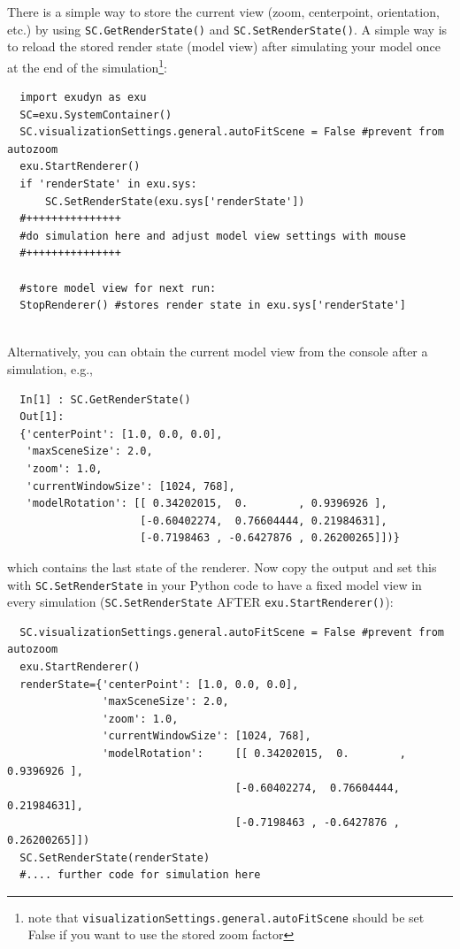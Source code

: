 \label{sec:storing:modelview}
There is a simple way to store the current view (zoom, centerpoint, orientation, etc.) by using \texttt{SC.GetRenderState()} and \texttt{SC.SetRenderState()}.
%
A simple way is to reload the stored render state (model view) after simulating your model once at the end of the simulation\footnote{
note that \texttt{visualizationSettings.general.autoFitScene} should be set False if you want to use the stored zoom factor}:
\pythonstyle\begin{lstlisting}
  import exudyn as exu
  SC=exu.SystemContainer()
  SC.visualizationSettings.general.autoFitScene = False #prevent from autozoom
  exu.StartRenderer()
  if 'renderState' in exu.sys:
      SC.SetRenderState(exu.sys['renderState']) 
  #+++++++++++++++
  #do simulation here and adjust model view settings with mouse
  #+++++++++++++++

  #store model view for next run:
  StopRenderer() #stores render state in exu.sys['renderState']
\end{lstlisting}
\horizontalRuler \\
%
Alternatively, you can obtain the current model view from the console after a simulation, e.g.,
\pythonstyle\begin{lstlisting}
  In[1] : SC.GetRenderState()
  Out[1]: 
  {'centerPoint': [1.0, 0.0, 0.0],
   'maxSceneSize': 2.0,
   'zoom': 1.0,
   'currentWindowSize': [1024, 768],
   'modelRotation': [[ 0.34202015,  0.        , 0.9396926 ],
                     [-0.60402274,  0.76604444, 0.21984631],
                     [-0.7198463 , -0.6427876 , 0.26200265]])}
\end{lstlisting}
%
which contains the last state of the renderer.
Now copy the output and set this with \texttt{SC.SetRenderState} in your Python code to have a fixed model view in every simulation (\texttt{SC.SetRenderState} AFTER \texttt{exu.StartRenderer()}):
\pythonstyle\begin{lstlisting}
  SC.visualizationSettings.general.autoFitScene = False #prevent from autozoom
  exu.StartRenderer()
  renderState={'centerPoint': [1.0, 0.0, 0.0],
               'maxSceneSize': 2.0,
               'zoom': 1.0,
               'currentWindowSize': [1024, 768],
               'modelRotation':     [[ 0.34202015,  0.        ,  0.9396926 ],
                                    [-0.60402274,  0.76604444,  0.21984631],
                                    [-0.7198463 , -0.6427876 ,  0.26200265]])
  SC.SetRenderState(renderState)
  #.... further code for simulation here
\end{lstlisting}
\horizontalRuler
%
%

